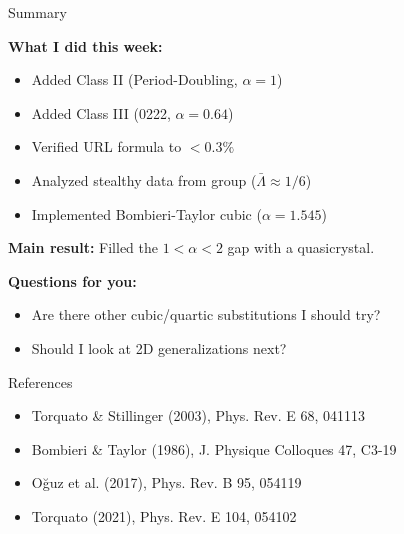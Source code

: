\documentclass[aspectratio=169, 11pt]{beamer}
\begin{document}
\begin{frame}{Summary}

\textbf{What I did this week:}
\begin{itemize}
    \item Added Class II (Period-Doubling, $\alpha = 1$)
    \item Added Class III (0222, $\alpha = 0.64$)
    \item Verified URL formula to $< 0.3\%$
    \item Analyzed stealthy data from group ($\bar{\Lambda} \approx 1/6$)
    \item Implemented Bombieri-Taylor cubic ($\alpha = 1.545$)
\end{itemize}

\vspace{0.5em}
\textbf{Main result:} Filled the $1 < \alpha < 2$ gap with a quasicrystal.

\vspace{0.5em}
\textbf{Questions for you:}
\begin{itemize}
    \item Are there other cubic/quartic substitutions I should try?
    \item Should I look at 2D generalizations next?
\end{itemize}
\end{frame}

\begin{frame}{References}

\small
\begin{itemize}
    \item Torquato \& Stillinger (2003), Phys. Rev. E 68, 041113
    \item Bombieri \& Taylor (1986), J. Physique Colloques 47, C3-19
    \item O\u{g}uz et al. (2017), Phys. Rev. B 95, 054119
    \item Torquato (2021), Phys. Rev. E 104, 054102
\end{itemize}
\end{frame}
\end{document}
